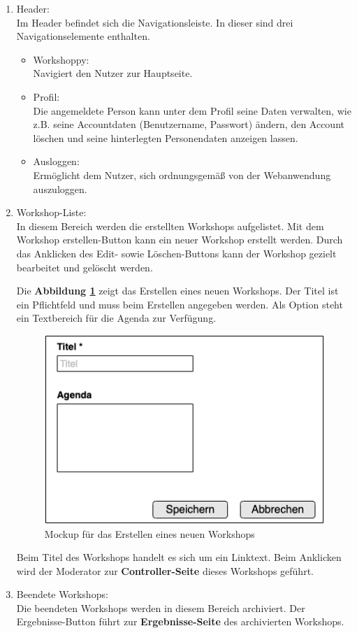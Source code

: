 \begin{enumerate}
\item Header:\\
Im Header befindet sich die Navigationsleiste. In dieser sind drei Navigationselemente enthalten.
\begin{itemize}
\item Workshoppy: \\
Navigiert den Nutzer zur Hauptseite. 
\item Profil:\\
Die angemeldete Person kann unter dem Profil seine Daten verwalten, wie z.B. seine Accountdaten (Benutzername, Passwort) ändern, den Account löschen und seine hinterlegten Personendaten anzeigen lassen.
\item Ausloggen:\\
Ermöglicht dem Nutzer, sich ordnungsgemäß von der Webanwendung auszuloggen.
\end{itemize}
\item Workshop-Liste:\\
In diesem Bereich werden die erstellten Workshops aufgelistet. Mit dem \glqq Workshop erstellen\grqq{}-Button kann ein neuer Workshop erstellt werden. Durch das Anklicken des Edit- sowie Löschen-Buttons kann der Workshop gezielt bearbeitet und gelöscht werden.\bigskip

Die \textbf{Abbildung \ref{fig:workshop erstellen}} zeigt das Erstellen eines neuen Workshops. Der Titel ist ein Pflichtfeld und muss beim Erstellen angegeben werden. Als Option steht ein Textbereich für die Agenda zur Verfügung.\bigskip

\begin{figure}[H]
  \begin{center}
    \includegraphics[scale=0.45]{img/workshop_erstellen}
	\caption{Mockup für das Erstellen eines neuen Workshops}  
	\label{fig:workshop erstellen}
  \end{center}   
\end{figure}

Beim Titel des Workshops handelt es sich um ein Linktext. Beim Anklicken wird der Moderator zur \textbf{Controller-Seite} dieses Workshops geführt.
\item Beendete Workshops:\\
Die beendeten Workshops werden in diesem Bereich archiviert. Der Ergebnisse-Button führt zur \textbf{Ergebnisse-Seite} des archivierten Workshops.
\end{enumerate}

